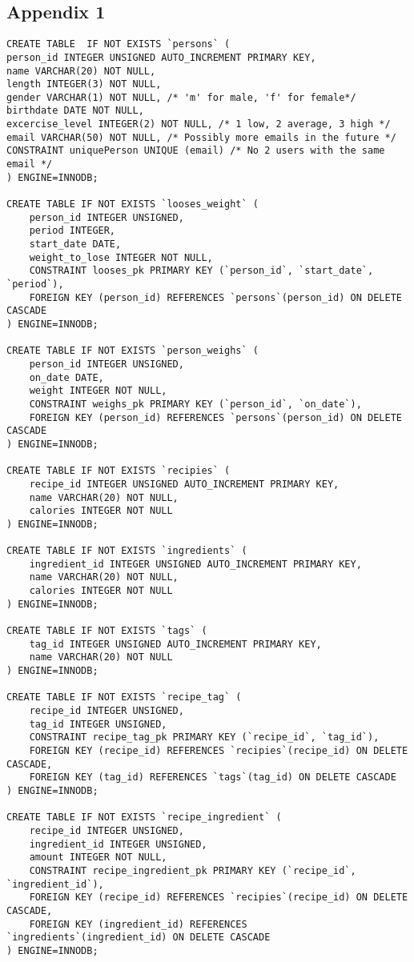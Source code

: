 \documentclass{article}
\begin{document}
\subsection*{Appendix 1}
\begin{lstlisting}[caption=Script of database]
CREATE TABLE  IF NOT EXISTS `persons` (
person_id INTEGER UNSIGNED AUTO_INCREMENT PRIMARY KEY,
name VARCHAR(20) NOT NULL,
length INTEGER(3) NOT NULL,
gender VARCHAR(1) NOT NULL, /* 'm' for male, 'f' for female*/
birthdate DATE NOT NULL,
excercise_level INTEGER(2) NOT NULL, /* 1 low, 2 average, 3 high */
email VARCHAR(50) NOT NULL, /* Possibly more emails in the future */
CONSTRAINT uniquePerson UNIQUE (email) /* No 2 users with the same email */
) ENGINE=INNODB;

CREATE TABLE IF NOT EXISTS `looses_weight` (
    person_id INTEGER UNSIGNED,
    period INTEGER,
    start_date DATE,
    weight_to_lose INTEGER NOT NULL,
    CONSTRAINT looses_pk PRIMARY KEY (`person_id`, `start_date`, `period`),
    FOREIGN KEY (person_id) REFERENCES `persons`(person_id) ON DELETE CASCADE
) ENGINE=INNODB;

CREATE TABLE IF NOT EXISTS `person_weighs` (
    person_id INTEGER UNSIGNED,
    on_date DATE,
    weight INTEGER NOT NULL,
    CONSTRAINT weighs_pk PRIMARY KEY (`person_id`, `on_date`),
    FOREIGN KEY (person_id) REFERENCES `persons`(person_id) ON DELETE CASCADE
) ENGINE=INNODB;

CREATE TABLE IF NOT EXISTS `recipies` (
    recipe_id INTEGER UNSIGNED AUTO_INCREMENT PRIMARY KEY,
    name VARCHAR(20) NOT NULL,
    calories INTEGER NOT NULL
) ENGINE=INNODB;

CREATE TABLE IF NOT EXISTS `ingredients` (
    ingredient_id INTEGER UNSIGNED AUTO_INCREMENT PRIMARY KEY,
    name VARCHAR(20) NOT NULL,
    calories INTEGER NOT NULL
) ENGINE=INNODB;

CREATE TABLE IF NOT EXISTS `tags` (
    tag_id INTEGER UNSIGNED AUTO_INCREMENT PRIMARY KEY,
    name VARCHAR(20) NOT NULL
) ENGINE=INNODB;

CREATE TABLE IF NOT EXISTS `recipe_tag` (
    recipe_id INTEGER UNSIGNED,
    tag_id INTEGER UNSIGNED,
    CONSTRAINT recipe_tag_pk PRIMARY KEY (`recipe_id`, `tag_id`),
    FOREIGN KEY (recipe_id) REFERENCES `recipies`(recipe_id) ON DELETE CASCADE,
    FOREIGN KEY (tag_id) REFERENCES `tags`(tag_id) ON DELETE CASCADE
) ENGINE=INNODB;

CREATE TABLE IF NOT EXISTS `recipe_ingredient` (
    recipe_id INTEGER UNSIGNED,
    ingredient_id INTEGER UNSIGNED,
    amount INTEGER NOT NULL,
    CONSTRAINT recipe_ingredient_pk PRIMARY KEY (`recipe_id`, `ingredient_id`),
    FOREIGN KEY (recipe_id) REFERENCES `recipies`(recipe_id) ON DELETE CASCADE,
    FOREIGN KEY (ingredient_id) REFERENCES `ingredients`(ingredient_id) ON DELETE CASCADE
) ENGINE=INNODB;


\end{lstlisting}
\end{document}
